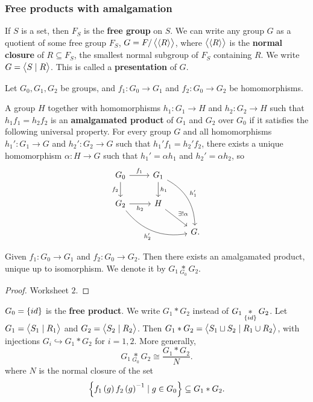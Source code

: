 \subsubsection{Free products with amalgamation}

\begin{definition*}
If $ S $ is a set, then $ F_S $ is the \textbf{free group} on $ S $. We can write any group $ G $ as a quotient of some free group $ F_S $, $ G = F / \left\langle \left\langle R \right\rangle \right\rangle $, where $ \left\langle \left\langle R \right\rangle \right\rangle $ is the \textbf{normal closure} of $ R \subseteq F_S $, the smallest normal subgroup of $ F_S $ containing $ R $. We write $ G = \left\langle S \mid R \right\rangle $. This is called a \textbf{presentation} of $ G $.
\end{definition*}

Let $ G_0, G_1, G_2 $ be groups, and $ f_1 : G_0 \to G_1 $ and $ f_2 : G_0 \to G_2 $ be homomorphisms.

\begin{definition*}
A group $ H $ together with homomorphisms $ h_1 : G_1 \to H $ and $ h_2 : G_2 \to H $ such that $ h_1f_1 = h_2f_2 $ is an \textbf{amalgamated product} of $ G_1 $ and $ G_2 $ over $ G_0 $ if it satisfies the following universal property. For every group $ G $ and all homomorphisms $ h_1' : G_1 \to G $ and $ h_2' : G_2 \to G $ such that $ h_1'f_1 = h_2'f_2 $, there exists a unique homomorphism $ \alpha : H \to G $ such that $ h_1' = \alpha h_1 $ and $ h_2' = \alpha h_2 $, so
$$
\begin{tikzcd}
G_0 \arrow{r}{f_1} \arrow[swap]{d}{f_2} & G_1 \arrow{d}{h_1} \arrow[bend left=30]{ddr}{h_1'} & \\
G_2 \arrow[swap]{r}{h_2} \arrow[bend right=30, swap]{drr}{h_2'} & H \arrow{dr}{\exists !\alpha} & \\
& & G.
\end{tikzcd}
$$
\end{definition*}

\begin{theorem}
Given $ f_1 : G_0 \to G_1 $ and $ f_2 : G_0 \to G_2 $. Then there exists an amalgamated product, unique up to isomorphism. We denote it by
$ G_1 \underset{G_0}{*} G_2 $.
\end{theorem}

\begin{proof}
Worksheet $ 2 $.
\end{proof}


$ G_0 = \cbr{id} $ is the \textbf{free product}. We write $ G_1 * G_2 $ instead of $ G_1 \underset{\cbr{id}}{*} G_2 $. Let $ G_1 = \left\langle S_1 \mid R_1 \right\rangle $ and $ G_2 = \left\langle S_2 \mid R_2 \right\rangle $. Then $ G_1 * G_2 = \left\langle S_1 \sqcup S_2 \mid R_1 \cup R_2 \right\rangle $, with injections $ G_i \hookrightarrow G_1 * G_2 $ for $ i = 1, 2 $. More generally,
$$ G_1 \underset{G_0}{*} G_2 \cong \dfrac{G_1 * G_2}{N}. $$
where $ N $ is the normal closure of the set
$$ \cbr{f_1\br{g}f_2\br{g}^{-1} \mid g \in G_0} \subseteq G_1 * G_2. $$

